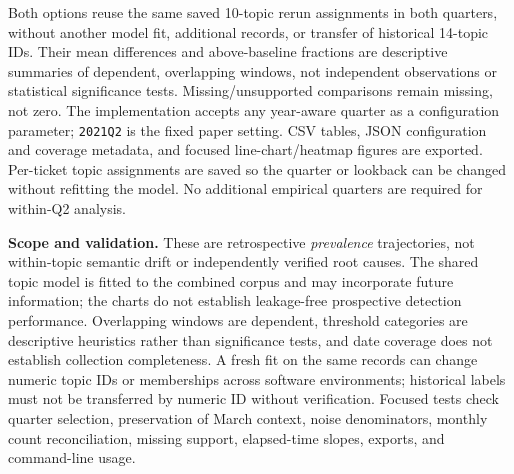 Both options reuse the same saved 10-topic rerun assignments in both quarters, without another model fit, additional records, or transfer of historical 14-topic IDs. Their mean differences and above-baseline fractions are descriptive summaries of dependent, overlapping windows, not independent observations or statistical significance tests. Missing/unsupported comparisons remain missing, not zero. The implementation accepts any year-aware quarter as a configuration parameter; \texttt{2021Q2} is the fixed paper setting. CSV tables, JSON configuration and coverage metadata, and focused line-chart/heatmap figures are exported. Per-ticket topic assignments are saved so the quarter or lookback can be changed without refitting the model. No additional empirical quarters are required for within-Q2 analysis.

\textbf{Scope and validation.} These are retrospective \emph{prevalence} trajectories, not within-topic semantic drift or independently verified root causes. The shared topic model is fitted to the combined corpus and may incorporate future information; the charts do not establish leakage-free prospective detection performance. Overlapping windows are dependent, threshold categories are descriptive heuristics rather than significance tests, and date coverage does not establish collection completeness. A fresh fit on the same records can change numeric topic IDs or memberships across software environments; historical labels must not be transferred by numeric ID without verification. Focused tests check quarter selection, preservation of March context, noise denominators, monthly count reconciliation, missing support, elapsed-time slopes, exports, and command-line usage.
